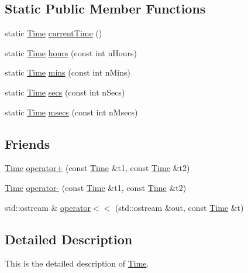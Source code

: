 \subsection*{Static Public Member Functions}
\begin{DoxyCompactItemize}
\item 
static \hyperlink{classprism_1_1_time}{Time} \hyperlink{classprism_1_1_time_ae440b8eee979a64a49fd026087d8bd5a}{current\+Time} ()
\item 
static \hyperlink{classprism_1_1_time}{Time} \hyperlink{classprism_1_1_time_a35581873592ae2ca5a9b43c3992bdcf2}{hours} (const int n\+Hours)
\item 
static \hyperlink{classprism_1_1_time}{Time} \hyperlink{classprism_1_1_time_ac1ffe68588575f1938803cc5d7445824}{mins} (const int n\+Mins)
\item 
static \hyperlink{classprism_1_1_time}{Time} \hyperlink{classprism_1_1_time_af26eac6363bbcfc91f711bf4561863aa}{secs} (const int n\+Secs)
\item 
static \hyperlink{classprism_1_1_time}{Time} \hyperlink{classprism_1_1_time_a5434c17adf40516de89837013e01c039}{msecs} (const int n\+Msecs)
\end{DoxyCompactItemize}
\subsection*{Friends}
\begin{DoxyCompactItemize}
\item 
\hyperlink{classprism_1_1_time}{Time} \hyperlink{classprism_1_1_time_ae2e555aa5b5c51e44b576d8baf48a2cd}{operator+} (const \hyperlink{classprism_1_1_time}{Time} \&t1, const \hyperlink{classprism_1_1_time}{Time} \&t2)
\item 
\hyperlink{classprism_1_1_time}{Time} \hyperlink{classprism_1_1_time_a09225563b0b317910b26c550ba74de64}{operator-\/} (const \hyperlink{classprism_1_1_time}{Time} \&t1, const \hyperlink{classprism_1_1_time}{Time} \&t2)
\item 
std\+::ostream \& \hyperlink{classprism_1_1_time_a25f100a1404d8c5535ddaafe65081fa7}{operator$<$$<$} (std\+::ostream \&out, const \hyperlink{classprism_1_1_time}{Time} \&t)
\end{DoxyCompactItemize}


\subsection{Detailed Description}
This is the detailed description of \hyperlink{classprism_1_1_time}{Time}. 

